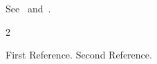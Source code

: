 \documentclass{article}
\begin{document}
See~\cite{A} and~\cite{B}.
\begin{thebibliography}{2}

\providecommand\bibinfo[2]{#2}

\bibinfo{title}{First Reference}.
\bibinfo{title}{Second Reference}.
\end{thebibliography}
\end{document}
